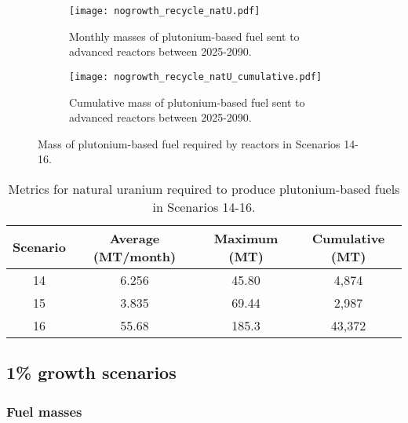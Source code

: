 \begin{figure}[h!]
    \centering
    \begin{subfigure}[b]{0.45\textwidth}
        \centering
        \texttt{[image: nogrowth\_recycle\_natU.pdf]}
        \caption{Monthly masses of plutonium-based fuel sent to 
        advanced reactors between 2025-2090.}
        \label{fig:nogrowth_recycle_AR_natu}
    \end{subfigure}
    \hfill
    \begin{subfigure}[b]{0.45\textwidth}
        \centering
        \texttt{[image: nogrowth\_recycle\_natU\_cumulative.pdf]}
        \caption{Cumulative mass of plutonium-based fuel
        sent to advanced reactors between 2025-2090.}
        \label{fig:nogrowth_recycle_natu_cumulative}
    \end{subfigure}
       \caption{Mass of plutonium-based fuel required by reactors
        in Scenarios 14-16.}
       \label{fig:nogrowth_recycle_natu}
\end{figure}

\begin{table}[h!]
    \centering 
    \caption{Metrics for natural uranium required to produce 
    plutonium-based fuels in Scenarios 14-16.}
    \label{tab:s14-16_natU}
    \begin{tabular}{c c c c}
        \hline 
        Scenario & Average (MT/month) & Maximum (MT) & Cumulative (MT) \\
        \hline 
        14 & 6.256 & 45.80 & 4,874 \\
        15 & 3.835 & 69.44 & 2,987 \\
        16 & 55.68 & 185.3 & 43,372 \\
        \hline
        
    \end{tabular}
\end{table}



\subsection{1\% growth scenarios}

\subsubsection{Fuel masses}

